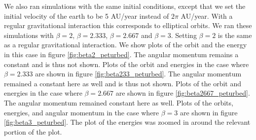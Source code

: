 \documentclass[reprint,english,notitlepage]{revtex4-1}  %
\begin{document}
We also ran simulations with the same initial conditions, except that we set the initial velocity of the earth to be 5 AU/year instead of $2\pi$ AU/year. With a regular gravitational interaction this corresponds to elliptical orbits. We ran these simulations with $\beta = 2$, $\beta = 2.333$, $\beta = 2.667$ and $\beta = 3$. Setting $\beta=2$ is the same as a regular gravitational interaction. We show plots of the orbit and the energy in this case in figure \ref{fig:beta2_peturbed}. The angular momentum remains a constant and is thus not shown. Plots of the orbit and energies in the case where $\beta = 2.333$ are shown in figure \ref{fig:beta233_peturbed}. The angular momentum remained a constant here as well and is thus not shown. Plots of the orbit and energies in the case where $\beta = 2.667$ are shown in figure \ref{fig:beta2667_peturbed}. The angular momentum remained constant here as well. Plots of the orbits, energies, and angular momentum in the case where $\beta = 3$ are shown in figure \ref{fig:beta3_peturbed}. The plot of the energies was zoomed in around the relevant portion of the plot.
\end{document}
